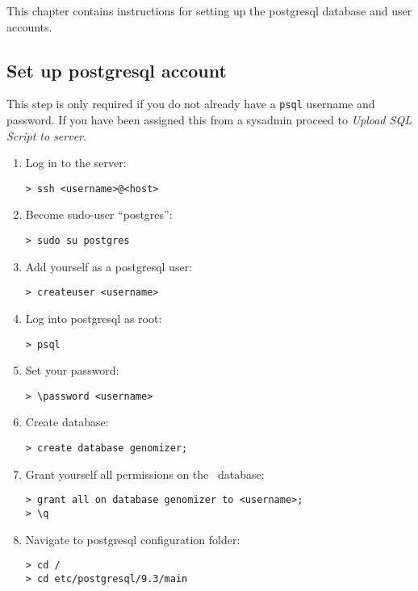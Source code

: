 This chapter contains instructions for setting up the postgresql database and user accounts.

    \subsection{Set up postgresql account}
      This step is only required if you do not already have a \texttt{psql} username and password. If you have been assigned this from a sysadmin proceed to \emph{Upload SQL Script to server}.

    \begin{enumerate}
      \item Log in to the server:
      \begin{verbatim}
> ssh <username>@<host>
      \end{verbatim}

      \item Become sudo-user “postgres”:
      \begin{verbatim}
> sudo su postgres
      \end{verbatim}

      \item Add yourself as a postgresql user:
      \begin{verbatim}
> createuser <username>
      \end{verbatim}

      \item Log into postgresql as root:
      \begin{verbatim}
> psql
      \end{verbatim}

      \item Set your password:
      \begin{verbatim}
> \password <username>
      \end{verbatim}

      \item Create database:
      \begin{verbatim}
> create database genomizer;
      \end{verbatim}

      \item Grant yourself all permissions on the \appName\ database: \begin{verbatim}
> grant all on database genomizer to <username>;
> \q
      \end{verbatim}

      \item Navigate to postgresql configuration folder:
      \begin{verbatim}
> cd /
> cd etc/postgresql/9.3/main
      \end{verbatim}


\end{enumerate}
